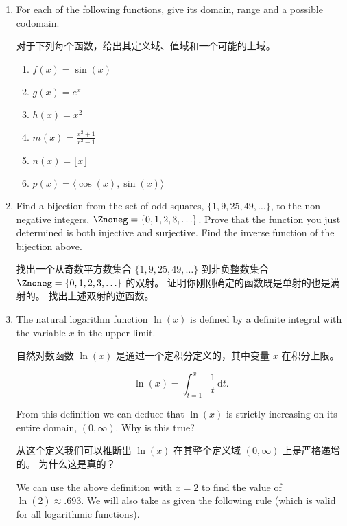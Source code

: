 \begin{enumerate}

  \item For each of the following functions, give its domain, range and a possible codomain.
  
  \noindent 对于下列每个函数，给出其定义域、值域和一个可能的上域。
  
  \begin{enumerate}
    \item \wbitemsep $f(x) = \sin{(x)}$
    \item \wbitemsep $g(x) = e^x$
    \item \wbitemsep $h(x) = x^2$
    \item \wbitemsep $m(x) = \frac{x^2+1}{x^2-1}$
    \item \wbitemsep $n(x) = \lfloor x \rfloor$
    \item \wbitemsep $p(x) = \langle \cos{(x)}, \sin{(x)} \rangle $
    \end{enumerate}
  
  \item Find a bijection from the set of odd squares, $\{1, 9, 25, 49, \ldots\}$,
  to the non-negative integers, $\Znoneg = \{0,1,2,3, \ldots\}$.
  Prove that the function you just determined is both injective and surjective.
  Find the inverse function of the bijection above.
  
  \noindent  找出一个从奇数平方数集合 $\{1, 9, 25, 49, \ldots\}$ 到非负整数集合 $\Znoneg = \{0,1,2,3, \ldots\}$ 的双射。
  证明你刚刚确定的函数既是单射的也是满射的。
  找出上述双射的逆函数。
  
  \wbvfill
  
  \workbookpagebreak
  
  \item The natural logarithm function $\ln (x)$ is defined by a definite
  integral with the variable $x$ in the upper limit.
  
  \noindent 自然对数函数 $\ln (x)$ 是通过一个定积分定义的，其中变量 $x$ 在积分上限。
  
  \[ \ln (x) = \int_{t=1}^{x} \frac{1}{t} \, \mbox{d}t. \]
  
  From this definition we can deduce that $\ln (x)$ is strictly increasing on its
  entire domain, $(0, \infty)$.
  Why is this true?
  
  从这个定义我们可以推断出 $\ln (x)$ 在其整个定义域 $(0, \infty)$ 上是严格递增的。
  为什么这是真的？
  
  We can use the above definition with $x=2$ to find the value of 
  $\ln (2) \approx .693$.
  We will also take as given the following 
  rule (which is valid for all logarithmic functions).
  

\end{enumerate}
